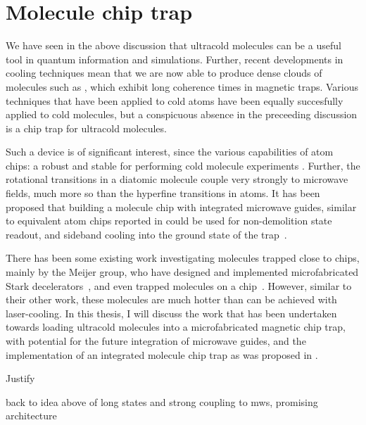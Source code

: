 \section{Molecule chip trap}

We have seen in the above discussion that ultracold molecules can be a useful
tool in quantum information and simulations. Further, recent developments in
cooling techniques mean that we are now able to produce dense clouds of
molecules such as \CaF{}, which exhibit long coherence times in magnetic traps.
Various techniques that have been applied to cold atoms have been equally
succesfully applied to cold molecules, but a conspicuous absence in the
preceeding discussion is a chip trap for ultracold molecules.

Such a device is of significant interest, since the various capabilities of
atom chips: a robust and stable  for performing cold molecule
experiments . Further, the rotational transitions in
a diatomic molecule couple very strongly to microwave fields, much more so than
the hyperfine transitions in atoms. It has been proposed that building a
molecule chip with integrated microwave guides, similar to equivalent atom
chips reported in 
could be used for non-demolition state readout,  and
sideband cooling into the ground state of the trap~\cite{Andre2006}.

There has been some existing work investigating molecules trapped close to
chips, mainly by the Meijer group, who have designed and implemented
microfabricated Stark decelerators~\cite{}, and even trapped molecules on a
chip~\cite{}. However, similar to their other work, these molecules are much
hotter than can be achieved with laser-cooling. In this thesis, I will discuss
the work that has been undertaken towards loading ultracold \CaF{} molecules
into a microfabricated magnetic chip trap, with potential for the future
integration of microwave guides, and the implementation of an integrated
molecule chip trap as was proposed in .



Justify

back to idea above of long states and strong coupling to mws, promising
architecture \cite{Andre2006}

